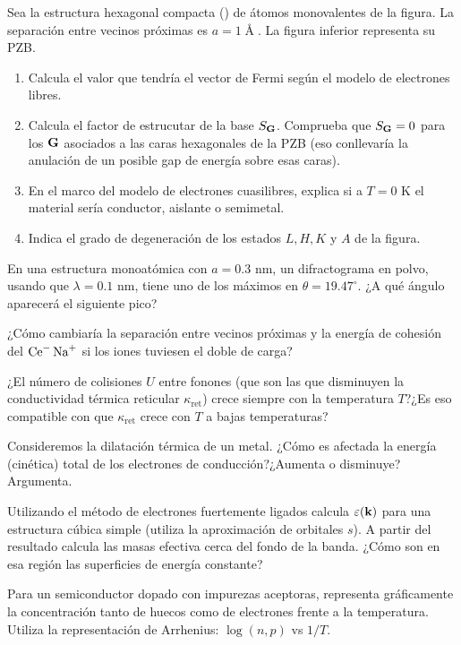 \begin{ejercicio}
	Sea la estructura hexagonal compacta (\hcp) de átomos monovalentes de la figura. La separación entre vecinos próximas es $a=1\unit{\Angstrom}$. La figura inferior representa su PZB.
	\begin{enumerate}[label=\alph*)]
		\item Calcula el valor que tendría el vector de Fermi según el modelo de electrones libres.
		\item Calcula el factor de estrucutar de la base $S_{\mathbf{G}}$. Comprueba que $S_{\mathbf{G}}=0$ para los $\mathbf{G}$ asociados a las caras hexagonales de la PZB (eso conllevaría la anulación de un posible gap de energía sobre esas caras).
		\item En el marco del modelo de electrones cuasilibres, explica si a $T=0$ K el material sería conductor, aislante o semimetal.
		\item Indica el grado de degeneración de los estados $L,H,K$ y $A$ de la figura.
	\end{enumerate}
\end{ejercicio}

\begin{ejercicio}
	En una estructura \fcc monoatómica con $a=0.3$ nm, un difractograma en polvo, usando que $\lambda=0.1$ nm, tiene uno de los máximos en $\theta=19.47^\circ$. ¿A qué ángulo aparecerá el siguiente pico?
\end{ejercicio}

\begin{ejercicio}
	¿Cómo cambiaría la separación entre vecinos próximas y la energía de cohesión del $\ce{Ce^- Na^+}$ si los iones tuviesen el doble de carga?
\end{ejercicio}

\begin{ejercicio}
	¿El número de colisiones $U$ entre fonones (que son las que disminuyen la conductividad térmica reticular $\kappa_{\text{ret}}$) crece siempre con la temperatura $T$?¿Es eso compatible con que $\kappa_{\text{ret}}$ crece con $T$ a bajas temperaturas?
\end{ejercicio}

\begin{ejercicio}
	Consideremos la dilatación térmica de un metal. ¿Cómo es afectada la energía (cinética) total de los electrones de conducción?¿Aumenta o disminuye? Argumenta.
\end{ejercicio}

\begin{ejercicio}
	Utilizando el método de electrones fuertemente ligados calcula $\varepsilon(\mathbf{k})$ para una estructura cúbica simple (utiliza la aproximación de orbitales $s$). A partir del resultado calcula las masas efectiva cerca del fondo de la banda. ¿Cómo son en esa región las superficies de energía constante?
\end{ejercicio}
\begin{ejercicio}
	Para un semiconductor dopado con impurezas aceptoras, representa gráficamente la concentración tanto de huecos como de electrones frente a la temperatura. Utiliza la representación de Arrhenius: $\log (n,p) $ vs $1/T$.
\end{ejercicio}

